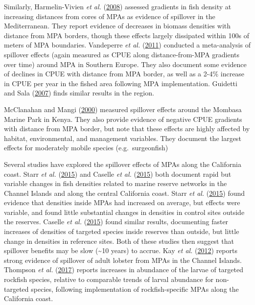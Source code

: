 \documentclass[twoside,12pt,final]{ucthesis-CA2012}
\begin{document}
\begin{ucmainmatter}
Similarly, Harmelin-Vivien \emph{et al.}
(\protect\hyperlink{ref-Harmelin-Vivien2008}{2008}) assessed gradients
in fish density at increasing distances from cores of MPAs as evidence
of spillover in the Mediterranean. They report evidence of decreases in
biomass densities with distance from MPA borders, though these effects
largely dissipated within 100s of meters of MPA boundaries. Vandeperre
\emph{et al.} (\protect\hyperlink{ref-Vandeperre2011}{2011}) conducted a
meta-analysis of spillover effects (again measured as CPUE along
distance-from-MPA gradients over time) around MPA in Southern Europe.
They also document some evidence of declines in CPUE with distance from
MPA border, as well as a 2-4\% increase in CPUE per year in the fished
area following MPA implementation. Guidetti and Sala
(\protect\hyperlink{ref-Guidetti2007a}{2007}) finds similar results in
the region.

McClanahan and Mangi (\protect\hyperlink{ref-McClanahan2000}{2000})
measured spillover effects around the Mombasa Marine Park in Kenya. They
also provide evidence of negative CPUE gradients with distance from MPA
border, but note that these effects are highly affected by habitat,
environmental, and management variables. They document the largest
effects for moderately mobile species (e.g.~surgeonfish)

Several studies have explored the spillover effects of MPAs along the
California coast. Starr \emph{et al.}
(\protect\hyperlink{ref-Starr2015}{2015}) and Caselle \emph{et al.}
(\protect\hyperlink{ref-Caselle2015}{2015}) both document rapid but
variable changes in fish densities related to marine reserve networks in
the Channel Islands and along the central California coast. Starr
\emph{et al.} (\protect\hyperlink{ref-Starr2015}{2015}) found evidence
that densities inside MPAs had increased on average, but effects were
variable, and found little substantial changes in densities in control
sites outside the reserves. Caselle \emph{et al.}
(\protect\hyperlink{ref-Caselle2015}{2015}) found similar results,
documenting faster increases of densities of targeted species inside
reserves than outside, but little change in densities in reference
sites. Both of these studies then suggest that spillover benefits may be
slow (\textasciitilde{}10 years) to accrue. Kay \emph{et al.}
(\protect\hyperlink{ref-Kay2012}{2012}) reports strong evidence of
spillover of adult lobster from MPAs in the Channel Islands. Thompson
\emph{et al.} (\protect\hyperlink{ref-Thompson2017}{2017}) reports
increases in abundance of the larvae of targeted rockfish species,
relative to comparable trends of larval abundance for non-targeted
species, following implementation of rockfish-specific MPAs along the
California coast.


\end{ucmainmatter}
\end{document}
